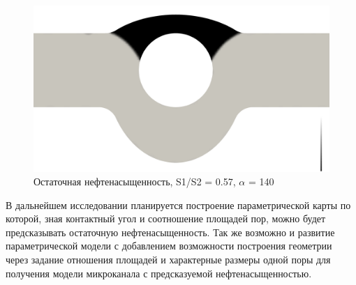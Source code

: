\documentclass[14pt,a4paper]{article}
\begin{document}
    \begin{figure}[H]
        \centering
        \includegraphics[width = 1\linewidth]{oilLeft}
        \caption{Остаточная нефтенасыщенность, S1/S2 = 0.57, $\alpha$ = 140}
        \label{fig:oilLeft}
    \end{figure}
    
    
    
    В дальнейшем исследовании планируется построение параметрической карты по которой, зная контактный угол и соотношение площадей пор, можно будет предсказывать остаточную нефтенасыщенность. Так же возможно и развитие параметрической модели с добавлением возможности построения геометрии через задание отношения площадей и характерные размеры одной поры для получения модели микроканала с предсказуемой нефтенасыщенностью. 
    
    
    
    
\end{document}
